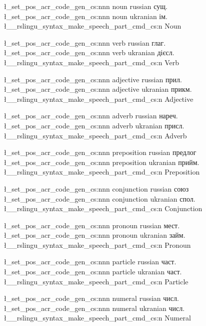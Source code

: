 

\l_set_pos_acr_code_gen_cs:nnn { noun } { russian } { сущ. } 
\l_set_pos_acr_code_gen_cs:nnn { noun } { ukranian } { ім. }
\l__rslingu_syntax_make_speech_part_cmd_cs:n { Noun }



\l_set_pos_acr_code_gen_cs:nnn { verb } { russian } { глаг. }
\l_set_pos_acr_code_gen_cs:nnn { verb } { ukranian } { дієсл. }
\l__rslingu_syntax_make_speech_part_cmd_cs:n { Verb }



\l_set_pos_acr_code_gen_cs:nnn { adjective } { russian } { прил. }
\l_set_pos_acr_code_gen_cs:nnn { adjective } { ukranian } { прикм. }
\l__rslingu_syntax_make_speech_part_cmd_cs:n { Adjective }



\l_set_pos_acr_code_gen_cs:nnn { adverb } { russian } { нареч. }
\l_set_pos_acr_code_gen_cs:nnn { adverb } { ukranian } { присл. }
\l__rslingu_syntax_make_speech_part_cmd_cs:n { Adverb }



\l_set_pos_acr_code_gen_cs:nnn { preposition } { russian } { предлог }
\l_set_pos_acr_code_gen_cs:nnn { preposition } { ukranian } { прийм. }
\l__rslingu_syntax_make_speech_part_cmd_cs:n { Preposition }



\l_set_pos_acr_code_gen_cs:nnn { conjunction } { russian } { союз }
\l_set_pos_acr_code_gen_cs:nnn { conjunction } { ukranian } { спол. }
\l__rslingu_syntax_make_speech_part_cmd_cs:n { Conjunction }



\l_set_pos_acr_code_gen_cs:nnn { pronoun } { russian } { мест. }
\l_set_pos_acr_code_gen_cs:nnn { pronoun } { ukranian } { займ. }
\l__rslingu_syntax_make_speech_part_cmd_cs:n { Pronoun }



\l_set_pos_acr_code_gen_cs:nnn { particle } { russian } { част. }
\l_set_pos_acr_code_gen_cs:nnn { particle } { ukranian } { част. }
\l__rslingu_syntax_make_speech_part_cmd_cs:n { Particle }



\l_set_pos_acr_code_gen_cs:nnn { numeral } { russian } { числ. }
\l_set_pos_acr_code_gen_cs:nnn { numeral } { ukranian } { числ. }
\l__rslingu_syntax_make_speech_part_cmd_cs:n { Numeral }



